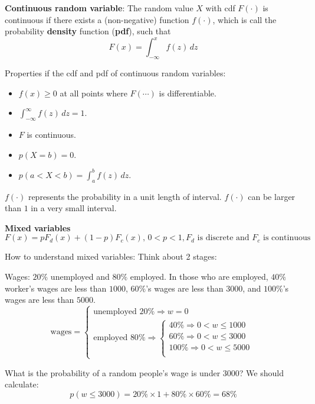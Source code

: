 \textbf{Continuous random variable}: The random value $X$ with cdf $F(\cdot )$ is continuous if there exists a (non-negative) function $f(\cdot )$, which is call the probability \textbf{density} function (\textbf{pdf}), such that \[
    F(x) = \int_{-\infty }^{x}f(z) \, dz
\]

Properties if the cdf and pdf of continuous random variables: \begin{itemize}
    \item $f(x) \geq 0$ at all points where $F(\cdots )$ is differentiable.
    \item $\int_{-\infty }^{\infty } f(z) \, dz = 1$.
    \item $F$ is continuous.
    \item $p(X=b) = 0$.
    \item $p(a<X<b) = \int_{a}^{b} f(z) \, dz$.
\end{itemize}

\begin{remark*}
    $f(\cdot )$ represents the probability in a unit length of interval.
    $f(\cdot )$ can be larger than $1$ in a very small interval.
\end{remark*}

\textbf{Mixed variables} \[
    F(x) = pF_d(x) + (1-p)F_c(x), \, 0 < p < 1, F_d \text{ is discrete and } F_c \text{ is continuous}
\]
\begin{remark*}
    How to understand mixed variables: Think about 2 stages:

    Wages: $20\%$ unemployed and $80\%$ employed. In those who are employed, $40\%$ worker's wages are less than $1000$, $60\%$'s wages are less than $3000$, and $100 \%$'s wages are less than $5000$. \[
        \text{wages} = \left\{\begin{array}{l}
            \text{unemployed } 20\% \Rightarrow w = 0 \\
            \text{employed } 80\% \Rightarrow \left\{\begin{array}{l}
                                                         40\% \Rightarrow 0 < w \leq 1000  \\
                                                         60\% \Rightarrow 0 < w \leq 3000  \\
                                                         100\% \Rightarrow 0 < w \leq 5000 \\
                                                     \end{array}\right.
        \end{array}\right.
    \]

    What is the probability of a random people's wage is under $3000$? We should calculate: \[
        p(w \leq 3000)  = 20\% \times 1 + 80\% \times 60\% = 68\%
    \]
\end{remark*}


